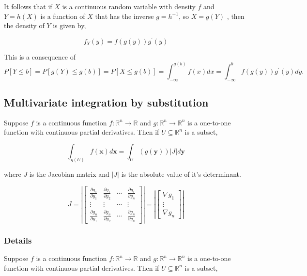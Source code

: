\documentclass[12pt,a4paper]{article}
\theoremstyle{regla}
\theoremstyle{remark}
\theoremstyle{definition}
\theoremstyle{nonumberbreak}
\begin{document}
It follows that if $X$ is a continuous random variable with density $f$ and $ Y = h(X)$ is a function of $X$ that has the inverse $g=h^{-1}$, so  $ X = g(Y)$ , then the density of $Y$ is given by,

$$f_Y(y)   = f (g(y)) g^\prime (y)$$

This is a consequence of
$$ P [Y \leq b] = P [g(Y) \leq g(b)] = P [X \leq g(b)] = \int_{- \infty} ^{g(b)}f(x)dx = \int_{- \infty} ^b f (g(y))g^\prime (y)dy.$$

\subsection{Multivariate integration by substitution}
\begin{fbox}
\begin{minipage}{0.97\textwidth}
Suppose $f$ is a continuous function 
$f: \mathbb{R}^n \rightarrow \mathbb{R}$ and $g: \mathbb{R}^n \rightarrow \mathbb{R}^n$ is a one-to-one function with continuous partial derivatives. Then if $ U \subseteq \mathbb{R}^n$ is a subset,

$$\int_{g(U)} f(\mathbf {x})d\mathbf {x}  = \int_{U}({g}(\mathbf {y}))|J|d\mathbf {y}$$

where $J$ is the Jacobian matrix and $|J|$ is the absolute value of it's determinant.


$$J=
\left|\begin{bmatrix}
\frac{\partial g_1}{\partial y_1} & \frac{\partial g_1}{\partial y_2} & \cdots &\frac{\partial g_1}{\partial y_n} \\
\vdots & \vdots & \cdots & \vdots \\
\frac{\partial g_n}{\partial y_1} & \frac{\partial g_n}{\partial y_2} & \cdots & \frac{\partial g_n}{\partial y_n} 
\end{bmatrix}\right| = 
\left|\begin{bmatrix}
\nabla g_1 \\
 \vdots \\
\nabla g_n 
\end{bmatrix}\right|$$


\end{minipage}
\end{fbox}
\subsubsection{Details}
Suppose $f$ is a continuous function 
$f: \mathbb{R}^n \rightarrow \mathbb{R}$ and $g: \mathbb{R}^n \rightarrow \mathbb{R}^n$ is a one-to-one function with continuous partial derivatives. Then if $ U \subseteq \mathbb{R}^n$ is a subset,
\end{document}
